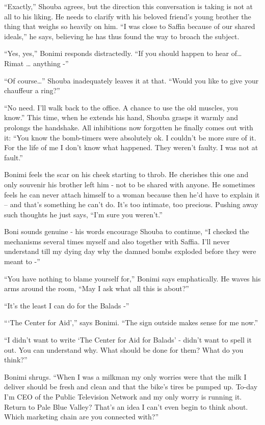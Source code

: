 \documentclass[twoside,11pt]{book}
\begin{document}
``Exactly,'' Shouba agrees, but the direction this conversation is taking is not at all to his
liking. He needs to clarify with his beloved friend's young brother the thing that weighs so heavily on him.
``I was close to Saffia because of our shared ideals,'' he says, believing he has thus found
the way to broach the subject.

``Yes, yes,'' Bonimi responds distractedly. ``If you should happen to hear
of{\dots} Rimat {\dots} anything -''

``Of course{\dots}'' Shouba inadequately leaves it
at that. ``Would you like to give your chauffeur a ring?''

``No need. I'll walk back to the office. A chance to use the old muscles, you know.'' This
time, when he extends his hand, Shouba grasps it warmly and prolongs the handshake. All inhibitions now forgotten he
finally comes out with it: ``You know the bomb-timers were absolutely ok. I couldn't be more sure of it.
For the life of me I don't know what happened. They weren't faulty. I was not at fault.''

Bonimi  feels the scar on his cheek starting to throb. He cherishes this one and only souvenir his brother left him -
not to be shared with anyone. He sometimes feels he can never attach himself to a woman because then he'd have to
explain it -- and that's something he can't do. It's too intimate, too precious. Pushing away such thoughts he just
says, ``I'm sure you weren't.''

Boni sounds genuine - his words encourage Shouba to continue, ``I checked the mechanisms several times
myself and also together with Saffia. I'll never understand till my dying day
why the damned bombs exploded before they were meant to -''

``You have nothing to blame yourself for,'' Bonimi says emphatically. He waves his arms around
the room, ``May I ask what all this is about?''

``It's the least I can do for the Balads -''

``\thinspace`The Center for Aid','' says Bonimi. ``The sign outside makes sense for me
now.''

``I didn't want to write `The Center for Aid for Balads' - didn't want to spell it out. You can understand
why. What should be done for them? What do you think?''

Bonimi shrugs. ``When I was a milkman my only worries were that the milk I deliver should be fresh and
clean and that the bike's tires be pumped up. To-day I'm CEO of the Public Television Network and my only worry is
running it.  Return to Pale Blue Valley? That's an idea I can't even begin to think about. Which marketing chain are
you connected with?''
\end{document}
